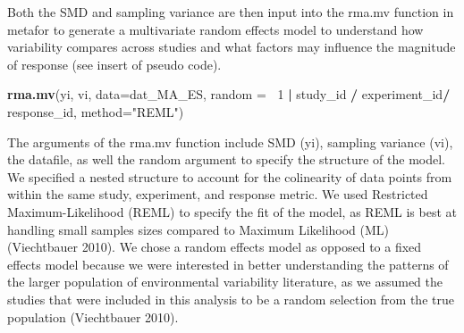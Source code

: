 \documentclass[12pt,twoside]{reedthesis}
\newenvironment{Shaded}{\begin{snugshade}}{\end{snugshade}}
\newcommand{\DataTypeTok}[1]{\textcolor[rgb]{0.13,0.29,0.53}{#1}}
\newcommand{\DecValTok}[1]{\textcolor[rgb]{0.00,0.00,0.81}{#1}}
\newcommand{\KeywordTok}[1]{\textcolor[rgb]{0.13,0.29,0.53}{\textbf{#1}}}
\newcommand{\NormalTok}[1]{#1}
\newcommand{\OperatorTok}[1]{\textcolor[rgb]{0.81,0.36,0.00}{\textbf{#1}}}
\newcommand{\StringTok}[1]{\textcolor[rgb]{0.31,0.60,0.02}{#1}}
\begin{document}
Both the SMD and sampling variance are then input into the rma.mv function in metafor to generate a multivariate random effects model to understand how variability compares across studies and what factors may influence the magnitude of response (see insert of pseudo code).
\begin{Shaded}
\begin{Highlighting}[]
\KeywordTok{rma.mv}\NormalTok{(yi, vi, }
       \DataTypeTok{data=}\NormalTok{dat_MA_ES, }
       \DataTypeTok{random =} \OperatorTok{~}\DecValTok{1} \OperatorTok{|}\StringTok{ }\NormalTok{study_id }\OperatorTok{/}\StringTok{ }\NormalTok{experiment_id}\OperatorTok{/}\StringTok{ }\NormalTok{response_id, }
       \DataTypeTok{method=}\StringTok{"REML"}\NormalTok{) }
\end{Highlighting}
\end{Shaded}
The arguments of the rma.mv function include SMD (yi), sampling variance (vi), the datafile, as well the random argument to specify the structure of the model. We specified a nested structure to account for the colinearity of data points from within the same study, experiment, and response metric. We used Restricted Maximum-Likelihood (REML) to specify the fit of the model, as REML is best at handling small samples sizes compared to Maximum Likelihood (ML) (Viechtbauer 2010). We chose a random effects model as opposed to a fixed effects model because we were interested in better understanding the patterns of the larger population of environmental variability literature, as we assumed the studies that were included in this analysis to be a random selection from the true population (Viechtbauer 2010).
\end{document}
